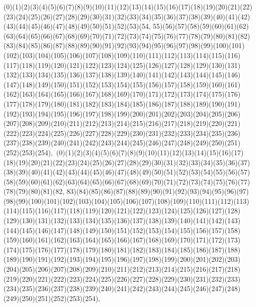 \documentclass[12pt]{article}
\begin{document}
{(0)(1)(2)(3)(4)(5)(6)(7)(8)(9)(10)(11)(12)(13)(14)(15)(16)(17)(18)(19)(20)(21)(22)(23)(24)(25)(26)(27)(28)(29)(30)(31)(32)(33)(34)(35)(36)(37)(38)(39)(40)(41)(42)(43)(44)(45)(46)(47)(48)(49)(50)(51)(52)(53)(54, 55)(56)(57)(58)(59)(60)(61)(62)(63)(64)(65)(66)(67)(68)(69)(70)(71)(72)(73)(74)(75)(76)(77)(78)(79)(80)(81)(82)(83)(84)(85)(86)(87)(88)(89)(90)(91)(92)(93)(94)(95)(96)(97)(98)(99)(100)(101)(102)(103)(104)(105)(106)(107)(108)(109)(110)(111)(112)(113)(114)(115)(116)(117)(118)(119)(120)(121)(122)(123)(124)(125)(126)(127)(128)(129)(130)(131)(132)(133)(134)(135)(136)(137)(138)(139)(140)(141)(142)(143)(144)(145)(146)(147)(148)(149)(150)(151)(152)(153)(154)(155)(156)(157)(158)(159)(160)(161)(162)(163)(164)(165)(166)(167)(168)(169)(170)(171)(172)(173)(174)(175)(176)(177)(178)(179)(180)(181)(182)(183)(184)(185)(186)(187)(188)(189)(190)(191)(192)(193)(194)(195)(196)(197)(198)(199)(200)(201)(202)(203)(204)(205)(206)(207)(208)(209)(210)(211)(212)(213)(214)(215)(216)(217)(218)(219)(220)(221)(222)(223)(224)(225)(226)(227)(228)(229)(230)(231)(232)(233)(234)(235)(236)(237)(238)(239)(240)(241)(242)(243)(244)(245)(246)(247)(248)(249)(250)(251)(252)(253)(254)$
, 
$
(0)(1)(2)(3)(4)(5)(6)(7)(8)(9)(10)(11)(12)(13)(14)(15)(16)(17)(18)(19)(20)(21)(22)(23)(24)(25)(26)(27)(28)(29)(30)(31)(32)(33)(34)(35)(36)(37)(38)(39)(40)(41)(42)(43)(44)(45)(46)(47)(48)(49)(50)(51)(52)(53)(54)(55)(56)(57)(58)(59)(60)(61)(62)(63)(64)(65)(66)(67)(68)(69)(70)(71)(72)(73)(74)(75)(76)(77)(78)(79)(80)(81)(82, 83)(84)(85)(86)(87)(88)(89)(90)(91)(92)(93)(94)(95)(96)(97)(98)(99)(100)(101)(102)(103)(104)(105)(106)(107)(108)(109)(110)(111)(112)(113)(114)(115)(116)(117)(118)(119)(120)(121)(122)(123)(124)(125)(126)(127)(128)(129)(130)(131)(132)(133)(134)(135)(136)(137)(138)(139)(140)(141)(142)(143)(144)(145)(146)(147)(148)(149)(150)(151)(152)(153)(154)(155)(156)(157)(158)(159)(160)(161)(162)(163)(164)(165)(166)(167)(168)(169)(170)(171)(172)(173)(174)(175)(176)(177)(178)(179)(180)(181)(182)(183)(184)(185)(186)(187)(188)(189)(190)(191)(192)(193)(194)(195)(196)(197)(198)(199)(200)(201)(202)(203)(204)(205)(206)(207)(208)(209)(210)(211)(212)(213)(214)(215)(216)(217)(218)(219)(220)(221)(222)(223)(224)(225)(226)(227)(228)(229)(230)(231)(232)(233)(234)(235)(236)(237)(238)(239)(240)(241)(242)(243)(244)(245)(246)(247)(248)(249)(250)(251)(252)(253)(254)$
, 
$
}
\end{document}
